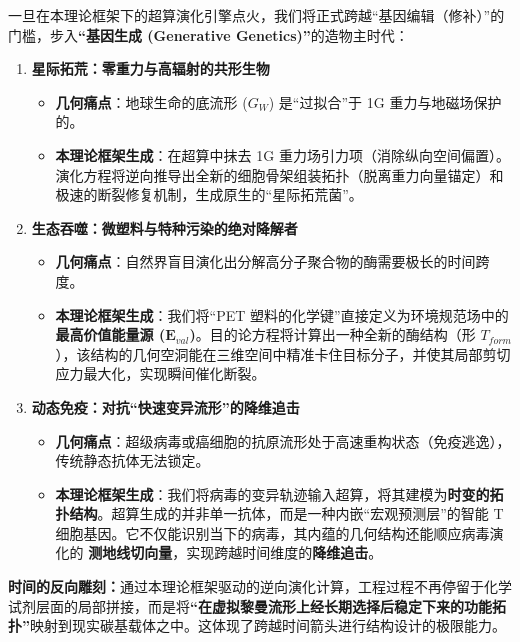 
一旦在本理论框架下的超算演化引擎点火，我们将正式跨越“基因编辑（修补）”的门槛，步入\textbf{“基因生成 (Generative Genetics)”}的造物主时代：

\begin{enumerate}
    \item \textbf{星际拓荒：零重力与高辐射的共形生物}
    \begin{itemize}
        \item \textbf{几何痛点}：地球生命的底流形 ($G_W$) 是“过拟合”于 1G 重力与地磁场保护的。
        \item \textbf{本理论框架生成}：在超算中抹去 1G 重力场引力项（消除纵向空间偏置）。演化方程将逆向推导出全新的细胞骨架组装拓扑（脱离重力向量锚定）和极速的断裂修复机制，生成原生的“星际拓荒菌”。
    \end{itemize}

    \item \textbf{生态吞噬：微塑料与特种污染的绝对降解者}
    \begin{itemize}
        \item \textbf{几何痛点}：自然界盲目演化出分解高分子聚合物的酶需要极长的时间跨度。
        \item \textbf{本理论框架生成}：我们将“PET 塑料的化学键”直接定义为环境规范场中的\textbf{最高价值能量源 ($\mathbf{E}_{val}$)}。目的论方程将计算出一种全新的酶结构（形 $T_{form}$），该结构的几何空洞能在三维空间中精准卡住目标分子，并使其局部剪切应力最大化，实现瞬间催化断裂。
    \end{itemize}

    \item \textbf{动态免疫：对抗“快速变异流形”的降维追击}
    \begin{itemize}
        \item \textbf{几何痛点}：超级病毒或癌细胞的抗原流形处于高速重构状态（免疫逃逸），传统静态抗体无法锁定。
        \item \textbf{本理论框架生成}：我们将病毒的变异轨迹输入超算，将其建模为\textbf{时变的拓扑结构}。超算生成的并非单一抗体，而是一种内嵌“宏观预测层”的智能 T 细胞基因。它不仅能识别当下的病毒，其内蕴的几何结构还能顺应病毒演化的 \textbf{测地线切向量}，实现跨越时间维度的\textbf{降维追击}。
    \end{itemize}
\end{enumerate}

\textbf{时间的反向雕刻：}通过本理论框架驱动的逆向演化计算，工程过程不再停留于化学试剂层面的局部拼接，而是将\textbf{“在虚拟黎曼流形上经长期选择后稳定下来的功能拓扑”}映射到现实碳基载体之中。这体现了跨越时间箭头进行结构设计的极限能力。


